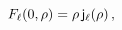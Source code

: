 $\mathop{F_{\ell}\/}\nolimits\!\left(0,\rho\right)=\rho\mathop{\mathsf{j}_{\ell%
}\/}\nolimits\!\left(\rho\right),$